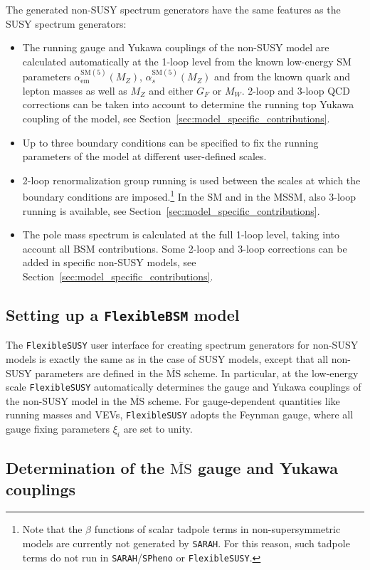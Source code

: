 \documentclass[final,3p,11pt,pdflatex]{elsarticle}
\makeatletter
\newcommand{\sarah}{\texttt{SARAH}\@\xspace}
\newcommand{\spheno}{\texttt{SPheno}\@\xspace}
\newcommand{\fs}{\texttt{FlexibleSUSY}\@\xspace}
\newcommand{\fbsm}{\texttt{FlexibleBSM}\@\xspace}
\newcommand{\ol}[1]{\overline{#1}}
\newcommand{\MSbar}{\ensuremath{\ol{\text{MS}}}\xspace}
\newcommand{\SM}{\ensuremath{\text{SM}}\xspace}
\newcommand{\secref}[1]{Section~\ref{#1}}
\def\as{\alpha_s}
\def\aem{\alpha_{\text{em}}}
\makeatother
\begin{document}
The generated non-SUSY spectrum generators have the same features as the SUSY
spectrum generators:
%
\begin{itemize}
\item The running gauge and Yukawa couplings of the non-SUSY model are
  calculated automatically at the 1-loop level from the known
  low-energy SM parameters
  $\aem^{\SM(5)}(M_Z)$, $\as^{\SM(5)}(M_Z)$
  and from the known quark and lepton masses as well as $M_Z$ and either $G_F$
  or $M_W$.  2-loop and 3-loop QCD corrections can be taken into
  account to determine the running top Yukawa coupling of the model,
  see \secref{sec:model_specific_contributions}.
\item Up to three boundary conditions can be specified to fix the
  running parameters of the model at different user-defined scales.
\item 2-loop renormalization group running is used between the scales
  at which the boundary conditions are imposed.\footnote{Note that
    the $\beta$ functions of scalar tadpole terms in
    non-supersymmetric models \cite{Goodsell:2012fm} are currently not
    generated by \sarah.  For this reason, such tadpole terms do not
    run in \sarah/\spheno or \fs.} In the SM and in the MSSM, also
  3-loop running is available, see
  \secref{sec:model_specific_contributions}.
\item The pole mass spectrum is calculated at the full 1-loop level,
  taking into account all BSM contributions.  Some 2-loop and 3-loop
  corrections can be added in specific non-SUSY models, see
  \secref{sec:model_specific_contributions}.
\end{itemize}

\subsection{Setting up a \fbsm model}

The \fs user interface for creating spectrum generators for non-SUSY
models is exactly the same as in the case of SUSY models, except that
all non-SUSY parameters are defined in the \MSbar scheme.  In
particular, at the low-energy scale \fs automatically determines
the gauge and Yukawa couplings of the non-SUSY model in the \MSbar
scheme.  For gauge-dependent quantities like running masses and VEVs,
\fs adopts the Feynman gauge, where all gauge fixing parameters
$\xi_i$ are set to unity.

\subsection{Determination of the \MSbar gauge and Yukawa couplings}
\label{sec:determination_of_g_Y}
\end{document}
